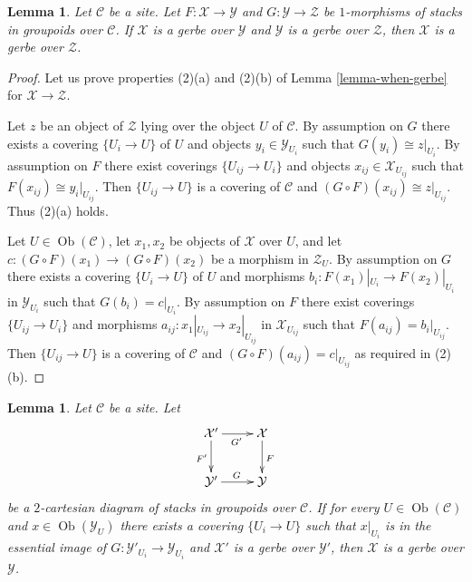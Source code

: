 \documentclass{stacks-project}
\theoremstyle{plain}
\newtheorem{lemma}[subsection]{Lemma}
\theoremstyle{definition}
\theoremstyle{remark}
\numberwithin{equation}{subsection}
\def\Ob{\mathop{\mathrm{Ob}}\nolimits}
\begin{document}
\begin{lemma}
\label{lemma-composition-gerbe}
Let $\mathcal{C}$ be a site. Let
$F : \mathcal{X} \to \mathcal{Y}$ and $G : \mathcal{Y} \to \mathcal{Z}$
be $1$-morphisms of stacks in groupoids over $\mathcal{C}$.
If $\mathcal{X}$ is a gerbe over $\mathcal{Y}$ and
$\mathcal{Y}$ is a gerbe over $\mathcal{Z}$, then
$\mathcal{X}$ is a gerbe over $\mathcal{Z}$.
\end{lemma}

\begin{proof}
Let us prove properties (2)(a) and (2)(b) of
Lemma \ref{lemma-when-gerbe}
for $\mathcal{X} \to \mathcal{Z}$.

\medskip\noindent
Let $z$ be an object of $\mathcal{Z}$ lying over the object $U$
of $\mathcal{C}$. By assumption on $G$ there exists
a covering $\{U_i \to U\}$ of $U$ and objects
$y_i \in \mathcal{Y}_{U_i}$ such that $G(y_i) \cong z|_{U_i}$.
By assumption on $F$ there exist coverings $\{U_{ij} \to U_i\}$
and objects $x_{ij} \in \mathcal{X}_{U_{ij}}$ such that
$F(x_{ij}) \cong y_i|_{U_{ij}}$.
Then $\{U_{ij} \to U\}$ is a covering of $\mathcal{C}$
and $(G \circ F)(x_{ij}) \cong z|_{U_{ij}}$. Thus (2)(a) holds.

\medskip\noindent
Let $U \in \Ob(\mathcal{C})$, let $x_1, x_2$ be objects of
$\mathcal{X}$ over $U$, and let
$c : (G \circ F)(x_1) \to (G \circ F)(x_2)$ be a morphism in
$\mathcal{Z}_U$. By assumption on $G$ there exists
a covering $\{U_i \to U\}$ of $U$ and morphisms
$b_i : F(x_1)|_{U_i} \to F(x_2)|_{U_i}$ in $\mathcal{Y}_{U_i}$
such that $G(b_i) = c|_{U_i}$.
By assumption on $F$ there exist coverings $\{U_{ij} \to U_i\}$
and morphisms $a_{ij} : x_1|_{U_{ij}} \to x_2|_{U_{ij}}$ in
$\mathcal{X}_{U_{ij}}$ such that $F(a_{ij}) = b_i|_{U_{ij}}$.
Then $\{U_{ij} \to U\}$ is a covering of $\mathcal{C}$
and $(G \circ F)(a_{ij}) = c|_{U_{ij}}$ as required in (2)(b).
\end{proof}

\begin{lemma}
\label{lemma-gerbe-descent}
Let $\mathcal{C}$ be a site. Let
$$
\xymatrix{
\mathcal{X}' \ar[r]_{G'} \ar[d]_{F'} & \mathcal{X} \ar[d]^F \\
\mathcal{Y}' \ar[r]^G & \mathcal{Y}
}
$$
be a $2$-cartesian diagram of stacks in groupoids over $\mathcal{C}$.
If for every $U \in \Ob(\mathcal{C})$ and
$x \in \Ob(\mathcal{Y}_U)$ there exists a covering
$\{U_i \to U\}$ such that $x|_{U_i}$ is in the essential
image of $G : \mathcal{Y}'_{U_i} \to \mathcal{Y}_{U_i}$ and
$\mathcal{X}'$ is a gerbe over $\mathcal{Y}'$, then
$\mathcal{X}$ is a gerbe over $\mathcal{Y}$.
\end{lemma}
\end{document}
